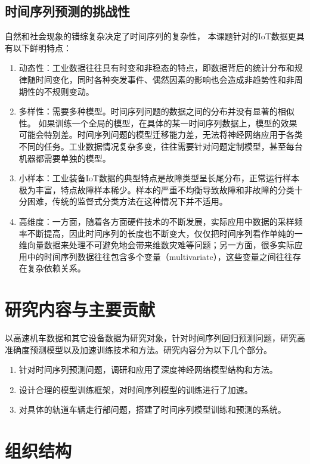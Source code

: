 \subsection{时间序列预测的挑战性}
自然和社会现象的错综复杂决定了时间序列的复杂性，
本课题针对的IoT数据更具有以下鲜明特点：
\begin{enumerate}[(1)]
  \item 动态性：工业数据往往具有时变和非稳态的特点，即数据背后的统计分布和规律随时间变化，同时各种突发事件、偶然因素的影响也会造成非趋势性和非周期性的不规则变动。
  \item 多样性：需要多种模型。时间序列问题的数据之间的分布并没有显著的相似性。
  如果训练一个全局的模型，在具体的某一时间序列数据上，模型的效果可能会特别差。时间序列问题的模型迁移能力差，无法将神经网络应用于各类不同的任务。工业数据情况复杂多变，往往需要针对问题定制模型，甚至每台机器都需要单独的模型。
  \item 小样本：工业装备IoT数据的典型特点是故障类型呈长尾分布，正常运行样本极为丰富，特点故障样本稀少。样本的严重不均衡导致故障和非故障的分类十分困难，传统的监督式分类方法在这种情况下并不适用。
  \item 高维度：一方面，随着各方面硬件技术的不断发展，实际应用中数据的采样频率不断提高，因此时间序列的长度也不断变大，仅仅把时间序列看作单纯的一维向量数据来处理不可避免地会带来维数灾难等问题；另一方面，很多实际应用中的时间序列数据往往包含多个变量（multivariate），这些变量之间往往存在复杂依赖关系。
\end{enumerate}


\section{研究内容与主要贡献}
以高速机车数据和其它设备数据为研究对象，针对时间序列回归预测问题，研究高准确度预测模型以及加速训练技术和方法。研究内容分为以下几个部分。
\begin{enumerate}[(1)]
  \item 针对时间序列预测问题，调研和应用了深度神经网络模型结构和方法。
  \item 设计合理的模型训练框架，对时间序列模型的训练进行了加速。
  \item 对具体的轨道车辆走行部问题，搭建了时间序列模型训练和预测的系统。
\end{enumerate}
\section{组织结构}